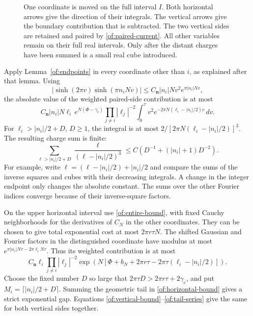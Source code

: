\documentclass[11pt]{article}
\numberwithin{equation}{section}
\theoremstyle{definition}\newtheorem{definition}[theorem]{Definition}
\theoremstyle{remark}\newtheorem{remark}[theorem]{Remark}
\begin{document}
\begin{figure}[ht]
\centering

\caption{One coordinate is moved on the full interval $I$.
Both horizontal arrows give the direction of their integrals.
The vertical arrows give the boundary contribution that is subtracted.
The two vertical sides are retained and paired by
\eqref{of:paired-current}. All other variables remain on their
full real intervals. Only after the distant charges have been
summed is a small real cube introduced.}
\end{figure}

Apply Lemma~\ref{of:endpoints} in every coordinate other than $i$,
as explained after that lemma.
Using
\[
 |\sinh(2\pi v)\sinh(\pi n_iNv)|
             \le C_{\boldsymbol n}|n_i|Nv^2 e^{\pi|n_i|Nv},
\]
the absolute value of the weighted paired-side contribution is at most
\begin{equation}\label{of:vertical-bound}
 C_{\boldsymbol n}|n_i|N\ell_i\,e^{N(\Phi-\gamma_e)}
       \prod_{j\ne i}|\ell_j|^{-2}
       \int_0^\tau v^2e^{-2\pi N(\ell_i-|n_i|/2)v}\,dv.
\end{equation}
For $\ell_i>|n_i|/2+D$, $D\ge1$, the integral is at most
$2/[2\pi N(\ell_i-|n_i|/2)]^3$. The resulting charge sum is finite:
\begin{equation}\label{of:tail-series}
 \sum_{\ell>|n_i|/2+D}\frac{\ell}{(\ell-|n_i|/2)^3}
                \le C\left(D^{-1}+(|n_i|+1)D^{-2}\right).
\end{equation}
For example, write $\ell=(\ell-|n_i|/2)+|n_i|/2$ and compare
the sums of the inverse squares and cubes with their decreasing
integrals. A change in the integer endpoint only changes the absolute
constant. The sums over the other Fourier indices converge because of their
inverse-square factors.

On the upper horizontal interval use \eqref{of:entire-bound}, with
fixed Cauchy neighborhoods for the derivatives of $C_N$ in the other coordinates. They can
be chosen to give total exponential cost at most $2\pi r\tau N$.
The shifted Gaussian and Fourier factors in the distinguished
coordinate have modulus at most
$e^{\pi|n_i|N\tau-2\pi\ell_iN\tau}$. Thus its weighted contribution
is at most
\begin{equation}\label{of:horizontal-bound}
 C_{\boldsymbol n}\ell_i\prod_{j\ne i}|\ell_j|^{-2}
 \exp\left(N\left[\Phi+b_N+2\pi r\tau
               -2\pi\tau(\ell_i-|n_i|/2)\right]\right).
\end{equation}
Choose the fixed number $D$ so large that
$2\pi\tau D>2\pi r\tau+2\gamma_e$, and put
$M_i=\lceil|n_i|/2+D\rceil$. Summing the geometric tail in
\eqref{of:horizontal-bound} gives a strict exponential gap.
Equations \eqref{of:vertical-bound}--\eqref{of:tail-series} give
the same for both vertical sides together.
\end{document}
